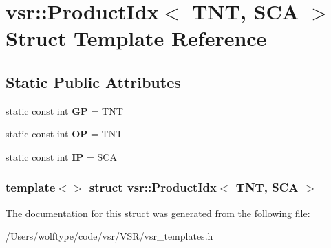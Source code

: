 \hypertarget{structvsr_1_1_product_idx_3_01_t_n_t_00_01_s_c_a_01_4}{\section{vsr\-:\-:Product\-Idx$<$ T\-N\-T, S\-C\-A $>$ Struct Template Reference}
\label{structvsr_1_1_product_idx_3_01_t_n_t_00_01_s_c_a_01_4}
}
\subsection*{Static Public Attributes}
\begin{DoxyCompactItemize}
\item 
\hypertarget{structvsr_1_1_product_idx_3_01_t_n_t_00_01_s_c_a_01_4_a86561ad5ae5cafa5b004c529cca830d0}{static const int {\bfseries G\-P} = T\-N\-T}\label{structvsr_1_1_product_idx_3_01_t_n_t_00_01_s_c_a_01_4_a86561ad5ae5cafa5b004c529cca830d0}

\item 
\hypertarget{structvsr_1_1_product_idx_3_01_t_n_t_00_01_s_c_a_01_4_a1643e0aac8b9aee8afdfca6eb2d08665}{static const int {\bfseries O\-P} = T\-N\-T}\label{structvsr_1_1_product_idx_3_01_t_n_t_00_01_s_c_a_01_4_a1643e0aac8b9aee8afdfca6eb2d08665}

\item 
\hypertarget{structvsr_1_1_product_idx_3_01_t_n_t_00_01_s_c_a_01_4_a75eb648fc3e63575fc81f897e91bafb4}{static const int {\bfseries I\-P} = S\-C\-A}\label{structvsr_1_1_product_idx_3_01_t_n_t_00_01_s_c_a_01_4_a75eb648fc3e63575fc81f897e91bafb4}

\end{DoxyCompactItemize}
\subsubsection*{template$<$$>$ struct vsr\-::\-Product\-Idx$<$ T\-N\-T, S\-C\-A $>$}



The documentation for this struct was generated from the following file\-:\begin{DoxyCompactItemize}
\item 
/\-Users/wolftype/code/vsr/\-V\-S\-R/vsr\-\_\-templates.\-h\end{DoxyCompactItemize}
